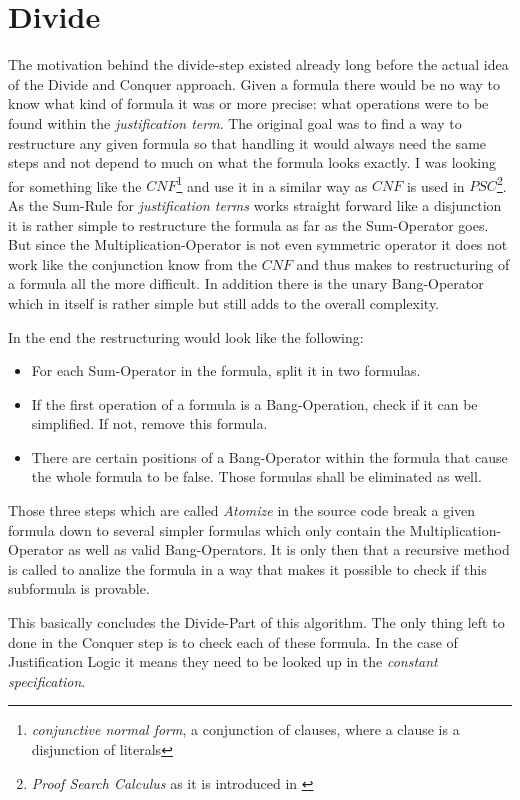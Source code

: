 \section{Divide}
The motivation behind the divide-step existed already long before the actual idea of the Divide and Conquer approach. Given a formula there would be no way to know what kind of formula it was or more precise: what operations were to be found within the \emph{justification term}. The original goal was to find a way to restructure any given formula so that handling it would always need the same steps and not depend to much on what the formula looks exactly. I was looking for something like the $CNF$\footnote{\emph{conjunctive normal form}, a conjunction of clauses, where a clause is a disjunction of literals} and use it in a similar way as $CNF$ is used in $PSC$\footnote{\emph{Proof Search Calculus} as it is introduced in \cite{jaeg}}. As the Sum-Rule for \emph{justification terms} works straight forward like a disjunction it is rather simple to restructure the formula as far as the Sum-Operator goes. But since the Multiplication-Operator is not even symmetric operator it does not work like the conjunction know from the $CNF$ and thus makes to restructuring of a formula all the more difficult. In addition there is the unary Bang-Operator which in itself is rather simple but still adds to the overall complexity.

In the end the restructuring would look like the following:
\begin{itemize}
	\item For each Sum-Operator in the formula, split it in two formulas.
	\item If the first operation of a formula is a Bang-Operation, check if it can be simplified. If not, remove this formula.
	\item There are certain positions of a Bang-Operator within the formula that cause the whole formula to be false. Those formulas shall be eliminated as well.
\end{itemize}
Those three steps which are called \emph{Atomize} in the source code break a given formula down to several simpler formulas which only contain the Multiplication-Operator as well as valid Bang-Operators. It is only then that a recursive method is called to analize the formula in a way that makes it possible to check if this subformula is provable.

This basically concludes the Divide-Part of this algorithm. The only thing left to done in the Conquer step is to check each of these formula. In the case of Justification Logic it means they need to be looked up in the \emph{constant specification}.


